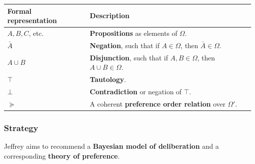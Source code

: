 \documentclass[11pt]{article}
\begin{document}
\begin{center}
\begin{tabular}{l|l}
Formal representation & Description\\
\hline
\(A, B, C\), etc. & \textbf{Propositions} as elements of \(\Omega\).\\
\(\bar{A}\) & \textbf{Negation}, such that if \(A \in \Omega\), then \(\bar{A} \in \Omega\).\\
\(A \cup B\) & \textbf{Disjunction}, such that if \(A, B \in \Omega\), then \(A \cup B \in \Omega\).\\
\(\top\) & \textbf{Tautology}.\\
\(\bot\) & \textbf{Contradiction} or negation of \(\top\).\\
\(\succeq\) & A coherent \textbf{preference order relation} over \(\Omega'\).\\
\end{tabular}
\end{center}
\subsubsection{Strategy}
\label{sec:org968b16d}
Jeffrey aims to recommend a \textbf{Bayesian model of deliberation} and a corresponding \textbf{theory of preference}.
\end{document}
